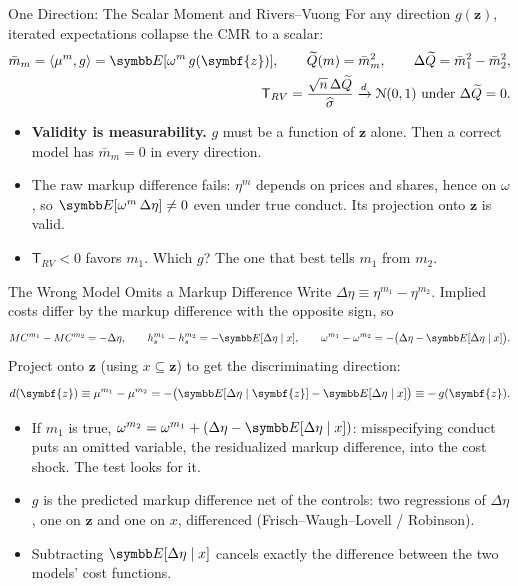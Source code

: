\documentclass[aspectratio=169,10pt]{beamer}
\begin{document}
\begin{frame}{One Direction: The Scalar Moment and Rivers--Vuong}
\small
For any direction $g(\symbf{z})$, iterated expectations collapse the CMR to a scalar:
\begin{align*}
\bar m_m = \langle \mu^m, g \rangle = \E[\omega^m\, g(\symbf{z})], \qquad \widetilde Q(m) = \bar m_m^2, \qquad \Delta\widetilde Q = \bar m_1^2 - \bar m_2^2,
\\
\mathsf{T}_{RV} = \frac{\sqrt{n}\, \Delta\widetilde Q}{\widehat\sigma} \xrightarrow{d} \mathcal{N}(0,1) \text{ under } \Delta\widetilde Q = 0 .
\end{align*}
\begin{itemize}
\item \textbf{Validity is measurability.} $g$ must be a function of $\symbf{z}$ alone. Then a correct model has $\bar m_m = 0$ in \alert{every} direction.
\item The raw markup difference fails: $\eta^m$ depends on prices and shares, hence on $\omega$, so $\E[\omega^m\, \Delta\eta] \neq 0$ even under true conduct. Its \alert{projection} onto $\symbf{z}$ is valid.
\item $\mathsf{T}_{RV} < 0$ favors $m_1$. Which $g$? The one that best tells $m_1$ from $m_2$.
\end{itemize}
\end{frame}


\begin{frame}{The Wrong Model Omits a Markup Difference}
\small
Write $\Delta\eta \equiv \eta^{m_1} - \eta^{m_2}$. Implied costs differ by the markup difference with the opposite sign, so
\begin{align*}
MC^{m_1} - MC^{m_2} = -\Delta\eta, \qquad
h_s^{m_1} - h_s^{m_2} = -\E[\Delta\eta \mid x], \qquad
\omega^{m_1} - \omega^{m_2} = -\big(\Delta\eta - \E[\Delta\eta \mid x]\big).
\end{align*}
Project onto $\symbf{z}$ (using $x \subseteq \symbf{z}$) to get the \alert{discriminating direction}:
\begin{align*}
d(\symbf{z}) \equiv \mu^{m_1} - \mu^{m_2} = -\big(\E[\Delta\eta \mid \symbf{z}] - \E[\Delta\eta \mid x]\big) \equiv -\,g(\symbf{z}).
\end{align*}
\begin{itemize}
\item If $m_1$ is true, $\omega^{m_2} = \omega^{m_1} + (\Delta\eta - \E[\Delta\eta \mid x])$: misspecifying conduct puts an \alert{omitted variable}, the residualized markup difference, into the cost shock. The test looks for it.
\item $g$ is the predicted markup difference net of the controls: two regressions of $\Delta\eta$, one on $\symbf{z}$ and one on $x$, differenced (Frisch--Waugh--Lovell / Robinson).
\item Subtracting $\E[\Delta\eta \mid x]$ cancels exactly the difference between the two models' cost functions.
\end{itemize}
\end{frame}
\end{document}
